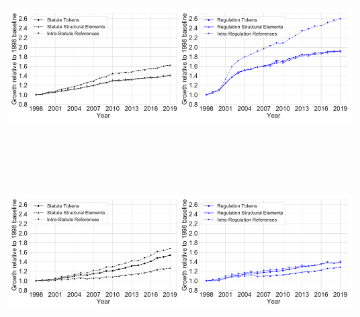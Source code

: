 \documentclass[varwidth, border=0pt]{standalone}
\begin{document}
	
	\begin{figure}
	\centering
\begin{subfigure}{\linewidth}
	\includegraphics[width=\linewidth]{../../graphics/growth-statistics-comparison-separated-us.pdf}~%
\end{subfigure}
~
\begin{subfigure}{\linewidth}
	\includegraphics[width=\linewidth]{../../graphics/growth-statistics-comparison-separated-de.pdf}~%
\end{subfigure}
	\end{figure}
	
\end{document}
